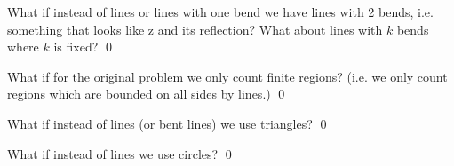 \newpage
\begin{ex}
  What if instead of lines or lines with one bend we have
  lines with 2 bends, i.e. something that looks like z and its reflection?
 What about lines with $k$ bends where $k$ is fixed?
  \qed
\end{ex}
  
\newpage
\begin{ex}
What if for the original problem we only count finite regions?
(i.e. we only count regions which are bounded on all sides by lines.)
\qed
\end{ex}

\newpage
\begin{ex}
What if instead of lines (or bent lines) we use
triangles?
\qed
\end{ex}


\newpage
\begin{ex}
What if instead of lines we use circles?
\qed
\end{ex}
